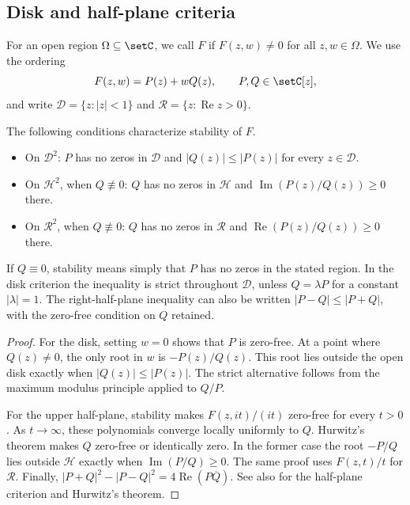 \subsection[regionStabilityCriteria]{Disk and half-plane criteria}

For an open region $\Omega\subseteq\setC$, we call $F$
 if $F(z,w)\neq0$ for all $z,w\in\Omega$.
We use the ordering
\[
 F(z,w)=P(z)+wQ(z), \qquad P,Q\in\setC[z],
\]
and write $\mathcal D=\{z:|z|<1\}$ and
$\mathcal R=\{z:\operatorname{Re}z>0\}$.

\begin{proposition}
\label{linearPencilStability}
The following conditions characterize stability of $F$.
\begin{itemize}
\item On $\mathcal D^2$: $P$ has no zeros in $\mathcal D$ and
  $|Q(z)|\leq|P(z)|$ for every $z\in\mathcal D$.
\item On $\mathcal H^2$, when $Q\not\equiv0$: $Q$ has no zeros in
  $\mathcal H$ and $\operatorname{Im}(P(z)/Q(z))\geq0$ there.
\item On $\mathcal R^2$, when $Q\not\equiv0$: $Q$ has no zeros in
  $\mathcal R$ and $\operatorname{Re}(P(z)/Q(z))\geq0$ there.
\end{itemize}
If $Q\equiv0$, stability means simply that $P$ has no zeros in the
stated region. In the disk criterion the inequality is strict throughout
$\mathcal D$, unless $Q=\lambda P$ for a constant $|\lambda|=1$.
The right-half-plane inequality can also be written
$|P-Q|\leq|P+Q|$, with the zero-free condition on $Q$ retained.
\end{proposition}

\begin{proof}
For the disk, setting $w=0$ shows that $P$ is zero-free.
At a point where $Q(z)\neq0$, the only root in $w$ is $-P(z)/Q(z)$.
This root lies outside the open disk exactly when $|Q(z)|\leq|P(z)|$.
The strict alternative follows from the maximum modulus principle
applied to $Q/P$.

For the upper half-plane, stability makes
$F(z,it)/(it)$ zero-free for every $t>0$.
As $t\to\infty$, these polynomials converge locally uniformly to $Q$.
Hurwitz's theorem makes $Q$ zero-free or identically zero.
In the former case the root $-P/Q$ lies outside $\mathcal H$
exactly when $\operatorname{Im}(P/Q)\geq0$.
The same proof uses $F(z,t)/t$ for $\mathcal R$.
Finally, $|P+Q|^2-|P-Q|^2=4\operatorname{Re}(P\overline Q)$.
See also \cite[Lemmas~2.2--2.3]{BorceaBranden2010}
for the half-plane criterion and Hurwitz's theorem.
\end{proof}

